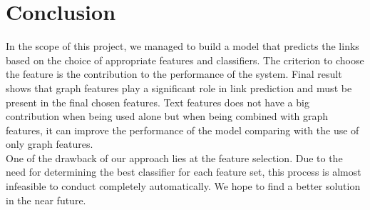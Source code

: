 \documentclass{article}
\begin{document}
\section{Conclusion}
\label{sec:conclusion}
In the scope of this project, we managed to build a model that predicts the links based on the choice of appropriate features and classifiers. The criterion to choose the feature is the contribution to the performance of the system. Final result shows that graph features play a significant role in link prediction and must be present in the final chosen features. Text features does not have a big contribution when being used alone but when being combined with graph features, it can improve the performance of the model comparing with the use of only graph features.\\
One of the drawback of our approach lies at the feature selection. Due to the need for determining the best classifier for each feature set, this process is almost infeasible to conduct completely automatically. We hope to find a better solution in the near future.



\end{document}
